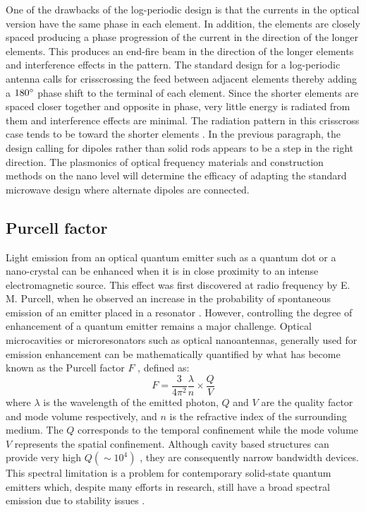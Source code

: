 \documentclass[11pt]{article}
\begin{document}
One of the drawbacks of the log-periodic design is that the currents in the optical version have the same phase in each element. In addition, the elements are closely spaced producing a phase progression of the current in the direction of the longer elements. This produces an end-fire beam in the direction of the longer elements and interference effects in the pattern. The standard design for a log-periodic antenna calls for crisscrossing the feed between adjacent elements thereby adding a $180\degree$ phase shift to the terminal of each element. Since the shorter elements are spaced closer together and opposite in phase, very little energy is radiated from them and interference effects are minimal. The radiation pattern in this crisscross case tends to be toward the shorter elements \cite{Balanis2015}. In the previous paragraph, the design calling for dipoles rather than solid rods appears to be a step in the right direction. The plasmonics of optical frequency materials and construction methods on the nano level will determine the efficacy of adapting the standard microwave design where alternate dipoles are connected.
\subsection{Purcell factor}
%
Light emission from an optical quantum emitter such as a quantum dot or a nano-crystal can be enhanced when it is in close proximity to an intense electromagnetic source. This effect was first discovered at radio frequency by E. M. Purcell, when he observed an increase in the probability of spontaneous emission of an emitter placed in a resonator \cite{Purcell1946}. However, controlling the degree of enhancement of a quantum emitter remains a major challenge. Optical microcavities or microresonators such as optical nanoantennas, generally used for emission enhancement can be mathematically quantified by what has become known as the Purcell factor $F$ \cite{Vahala2003}, defined as:
%
\begin{equation}
  F = \frac{3}{4 \pi^2} \frac{ \lambda}{n} \times \frac{Q}{V}
  \label{eq:purcell}
\end{equation}
%
where $\lambda$ is the wavelength of the emitted photon, $Q$ and $V$ are the quality factor and mode volume respectively, and $n$ is the refractive index of the surrounding medium. The $Q$ corresponds to the temporal confinement while the mode volume $V$ represents the spatial confinement. Although cavity based structures can provide very high $Q (\sim 10^4)$ \cite{Song2005}, they are consequently narrow bandwidth devices. This spectral limitation is a problem for contemporary solid-state quantum emitters which, despite many efforts in research, still have a broad spectral emission due to stability issues \cite{Gaebel2004}.
\end{document}
